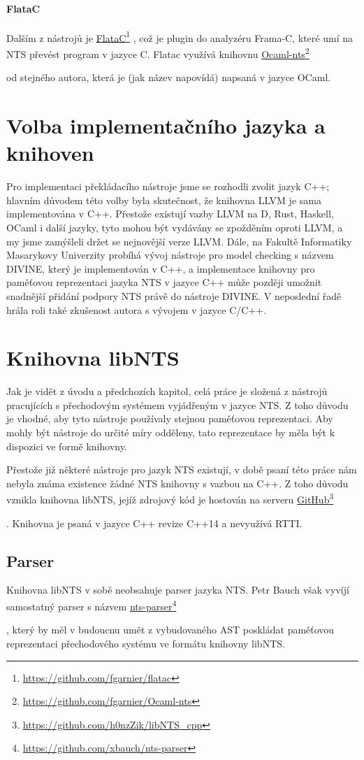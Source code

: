 \documentclass[12pt]{fithesis2}
\newcommand\fnurl[2]{%
  \href{#2}{#1}\footnote{\url{#2}}%
}
\begin{document}
\paragraph{FlataC}
Dalším z nástrojů je
\fnurl{FlataC}{https://github.com/fgarnier/flatac},
což je plugin do analyzéru Frama-C, které umí na NTS převést program v jazyce C.
Flatac využívá knihovnu
\fnurl{Ocaml-nts}{https://github.com/fgarnier/Ocaml-nts}
od stejného autora, která je (jak název napovídá) napsaná v jazyce OCaml.

\section{Volba implementačního jazyka a knihoven}
Pro implementaci překládacího nástroje jsme se rozhodli zvolit jazyk C++; hlavním důvodem této volby byla skutečnost, že knihovna LLVM je sama implementována v C++. Přestože existují vazby LLVM na D, Rust, Haskell, OCaml i další jazyky, tyto mohou být vydávány se zpožděním oproti LLVM, a my jsme zamýšleli držet se nejnovější verze LLVM. Dále, na Fakultě Informatiky Masarykovy Univerzity probíhá vývoj nástroje pro model checking s názvem DIVINE, který je implementován v C++, a implementace knihovny pro paměťovou reprezentaci jazyka NTS v jazyce C++ může později umožnit snadnější přidání podpory NTS právě do nástroje DIVINE\cite{BBH+13}. V neposlední řadě hrála roli také zkušenost autora s vývojem v jazyce C/C++.

\section{Knihovna libNTS}
Jak je vidět z úvodu a předchozích kapitol, celá práce je složená z nástrojů pracujících s přechodovým systémem vyjádřeným v jazyce NTS. Z toho důvodu je vhodné, aby tyto nástroje používaly stejnou paměťovou reprezentaci. Aby mohly být nástroje do určité míry odděleny, tato reprezentace by měla být k dispozici ve formě knihovny.

Přestože již některé nástroje pro jazyk NTS existují, v době psaní této práce nám nebyla známa existence žádné NTS knihovny s vazbou na C++. Z toho důvodu vznikla knihovna libNTS, jejíž zdrojový kód je hostován na serveru
\fnurl{GitHub}{https://github.com/h0nzZik/libNTS_cpp}
. Knihovna je psaná v jazyce C++ revize C++14 a nevyužívá RTTI.

\subsection{Parser}
Knihovna libNTS v sobě neobsahuje parser jazyka NTS. Petr Bauch však vyvíjí samostatný parser s názvem
\fnurl{nts-parser}{https://github.com/xbauch/nts-parser}
, který by měl v budoucnu umět z vybudovaného AST poskládat paměťovou reprezentaci přechodového systému ve formátu knihovny libNTS.
\end{document}
